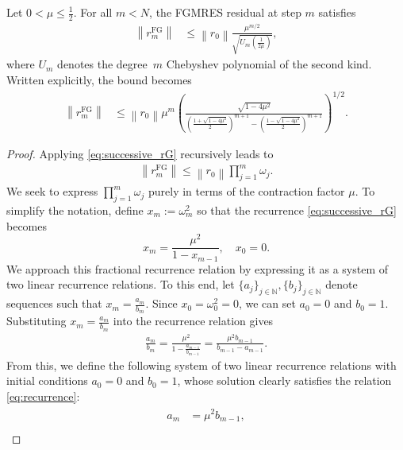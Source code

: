 \documentclass{siamart251216}
\def\N{\mathbb{N}}
\begin{document}
{\begin{theorem} \label{thm:explicit_bound}
    Let $0 < \mu \leq \frac{1}{2}$. For all $m<N$, the FGMRES residual at step $m$ satisfies
    \begin{align} \label{eq:cheb_bound}
        \left\|r_m^{\mathrm{FG}}\right\| & \leq \left\|r_0\right\| \frac{\mu^{m/2}}{\sqrt{U_m\left(\frac{1}{2\mu}\right)}},
    \end{align}
    where $U_m$ denotes the degree~$m$ Chebyshev polynomial of the second kind.
    Written explicitly, the bound becomes 
    \begin{align} \label{eq:explicit_bound}
        \left\|r_m^{\mathrm{FG}}\right\| & \leq \left\|r_0\right\| \mu^m \left( \frac{\sqrt{1 - 4\mu^2}}{\left( \frac{1 + \sqrt{1 - 4\mu^2}}{2} \right)^{m+1} - \left( \frac{1 - \sqrt{1 - 4\mu^2}}{2} \right)^{m+1}} \right)^{1/2}.
    \end{align}
\end{theorem}
\begin{proof}
    Applying \eqref{eq:successive_rG} recursively leads to
    \begin{align} \label{eq:bound}
        \left\|r_m^{\mathrm{FG}}\right\| \leq \left\|r_0\right\| \prod_{j=1}^m \omega_j.
    \end{align}
    We seek to express $ \prod_{j=1}^m \omega_j$ purely in terms of the contraction factor $\mu$. To simplify the notation, define $x_m := \omega_m^2$ so that the recurrence \eqref{eq:successive_rG} becomes
    $$x_m = \frac{\mu^2}{1 - x_{m-1}}, \quad x_0 = 0.$$
    We approach this fractional recurrence relation by expressing it as a system of two linear recurrence relations. To this end, let $\{a_j\}_{j \in \N}, \{b_j\}_{j \in \N}$ denote sequences such that $x_m = \frac{a_m}{b_m}$. Since $x_0 = \omega_0^2 = 0$, we can set $a_0 = 0$ and $b_0 = 1$. Substituting $x_m = \frac{a_m}{b_m}$ into the recurrence relation gives
    \begin{align} \label{eq:recurrence}
        \frac{a_m}{b_m} = \frac{\mu^2}{1 - \frac{a_{m-1}}{b_{m-1}}} = \frac{\mu^2 b_{m-1}}{b_{m-1} - a_{m-1}}.
    \end{align}
    From this, we define the following system of two linear recurrence relations with initial conditions $a_0 = 0$ and $b_0 = 1$, whose solution clearly satisfies the relation \eqref{eq:recurrence}:
    \begin{align} \label{eq:recurrence_system}
        \begin{aligned}
            a_m & = \mu^2 b_{m-1},     \\

\end{aligned}
\end{align}
\end{proof}}
\end{document}
